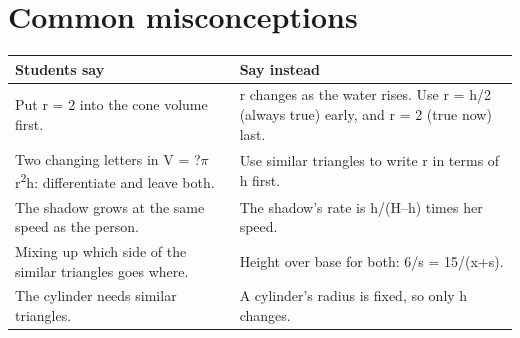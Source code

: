 \documentclass[11pt]{article}
\begin{document}
\section*{Common misconceptions}\begin{tabularx}{\textwidth}{@{}X X@{}}\toprule Students say & Say instead\\\midrule
Put r = 2 into the cone volume first. & r changes as the water rises. Use r = h/2 (always true) early, and r = 2 (true now) last.\\
Two changing letters in V = ?$\pi$r\textsuperscript{2}h: differentiate and leave both. & Use similar triangles to write r in terms of h first.\\
The shadow grows at the same speed as the person. & The shadow's rate is h/(H--h) times her speed.\\
Mixing up which side of the similar triangles goes where. & Height over base for both: 6/s = 15/(x+s).\\
The cylinder needs similar triangles. & A cylinder's radius is fixed, so only h changes.\\
\bottomrule\end{tabularx}
\end{document}
